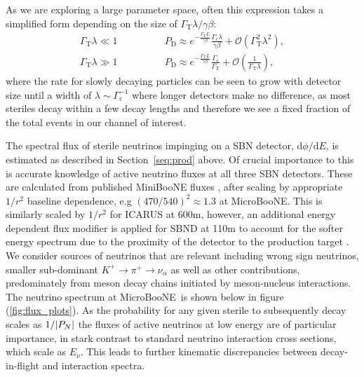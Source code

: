 \documentclass[11pt, a4paper]{article}
\newcommand{\refsec}[1]{Section~\ref{#1}}
\def\muboone{MicroBooNE}
\def\ster{\ensuremath N}
\begin{document}
As we are exploring a large parameter space, often this expression takes a
simplified form depending on the size of $\Gamma_\text{T}\lambda/\gamma\beta$:
%
\begin{align} 
%
\Gamma_\text{T}\lambda \ll 1\qquad&\qquad P_\text{D} \approx
e^{-\frac{\Gamma_\text{T}L}{\gamma\beta}}\frac{\Gamma_\text{c}\lambda}{\gamma\beta}
+ \mathcal{O}\left(\Gamma_\text{T}^2\lambda^2\right),\label{eq:prob_dec1}\\
%
\Gamma_\text{T}\lambda \gg 1\qquad&\qquad P_\text{D} \approx
e^{-\frac{\Gamma_\text{T}L}{\gamma\beta}}\frac{\Gamma_\text{c}}{\Gamma_\text{T}}
+ \mathcal{O}\left(\frac{1}{\Gamma_\text{T}\lambda}\right),
\label{eq:prob_dec2}
%
\end{align}
%
where the rate for slowly decaying particles can be seen to grow with detector
size until a width of $\lambda\sim\Gamma_\text{c}^{-1}$ where longer detectors
make no difference, as most steriles decay within a few decay lengths and
therefore we see a fixed fraction of the total events in our channel of
interest. 

The spectral flux of sterile neutrinos impinging on a SBN detector, $\mathrm{d}\phi/\mathrm{d}E$, is estimated as described in \refsec{seq:prod} above.
Of crucial importance to this is accurate knowledge of active neutrino fluxes at all three SBN detectors. These are calculated from published MiniBooNE fluxes \cite{AguilarArevalo:2008yp}, after scaling by appropriate
$1/r^2$ baseline dependence, e.g $(470/540)^2 \approx 1.3$ at \muboone. This
is similarly scaled by $1/r^2$ for ICARUS at 600m, however, an additional
energy dependent flux modifier is applied for SBND at 110m to account for the
softer energy spectrum due to the proximity of the detector to the production
target \cite{Antonello:2015lea}. We consider sources of neutrinos that are
relevant including wrong sign neutrinos, smaller sub-dominant $K^+\rightarrow
\pi^+\rightarrow \nu_\alpha$ as well as other contributions, predominately from
meson decay chains initiated by meson-nucleus interactions. The neutrino spectrum at \muboone\ is shown below in figure
(\ref{fig:flux_plots}). As the probability for any given sterile to subsequently decay scales as
$1/|P_{\ster}|$ the fluxes of active neutrinos at low energy are of particular importance, in stark contrast to standard neutrino interaction cross sections, which scale as $E_\nu$. This leads to further kinematic discrepancies between decay-in-flight and interaction spectra. 
\end{document}
